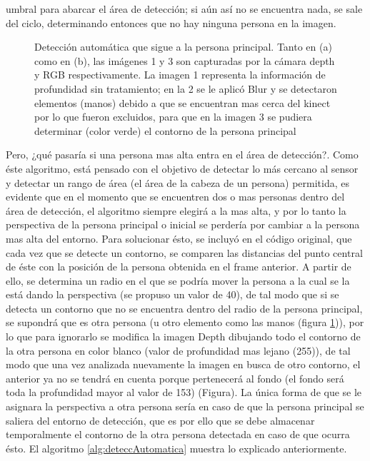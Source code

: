 \documentclass[a4paper,openright,12pt]{report}
\begin{document}
umbral para abarcar el área de detección; si aún así no se encuentra nada, se sale del ciclo, determinando entonces que no hay ninguna persona en la imagen.\\
\begin{figure}[H]
	\centering
	\caption[Detección automática que sigue a la persona principal]{Detección automática que sigue a la persona principal. Tanto en (a) como en (b), las imágenes 1 y 3 son capturadas por la cámara depth y RGB respectivamente. La imagen 1 representa la información de profundidad sin tratamiento; en la 2 se le aplicó Blur y se detectaron elementos (manos) debido a que se encuentran mas cerca del kinect por lo que fueron excluidos, para que en la imagen 3 se pudiera determinar (color verde) el contorno de la persona principal} 
	\label{fig:deteccAutoManos}
\end{figure}
Pero, ¿qué pasaría si una persona mas alta entra en el área de detección?. Como éste algoritmo, está pensado con el objetivo de detectar lo más cercano al sensor y detectar un rango de área (el área de la cabeza de un persona) permitida, es evidente que en el momento que se encuentren dos o mas personas dentro del área de detección, el algoritmo siempre elegirá a la mas alta, y por lo tanto la perspectiva de la persona principal o inicial se perdería por cambiar a la persona mas alta del entorno. Para solucionar ésto, se incluyó en el código original, que cada vez que se detecte un contorno, se comparen las distancias del punto central de éste con la posición de la persona obtenida en el frame anterior. A partir de ello, se determina un radio en el que se podría mover la persona a la cual se la está dando la perspectiva (se propuso un valor de 40), de tal modo que si se detecta un contorno que no se encuentra dentro del radio de la persona principal, se supondrá que es otra persona (u otro elemento como las manos (figura \ref{fig:deteccAutoManos})), por lo que para ignorarlo se modifica la imagen Depth dibujando todo el contorno de la otra persona en color blanco (valor de profundidad mas lejano (255)), de tal modo que una vez analizada nuevamente la imagen en busca de otro contorno, el anterior ya no se tendrá en cuenta porque pertenecerá al fondo (el fondo será toda la profundidad mayor al valor de 153) (Figura). La única forma de que se le asignara la perspectiva a otra persona sería en caso de que la persona principal se saliera del entorno de detección, que es por ello que se debe almacenar temporalmente el contorno de la otra persona detectada en caso de que ocurra ésto. El algoritmo \ref{alg:deteccAutomatica} muestra lo explicado anteriormente.
\end{document}
